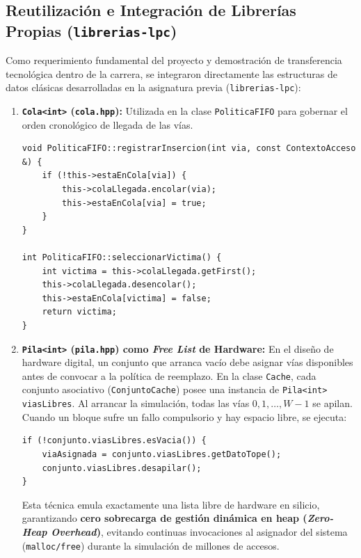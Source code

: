 \documentclass[11pt,letterpaper]{article}
\begin{document}
\subsection{Reutilización e Integración de Librerías Propias (\texttt{librerias-lpc})}
Como requerimiento fundamental del proyecto y demostración de transferencia tecnológica dentro de la carrera, se integraron directamente las estructuras de datos clásicas desarrolladas en la asignatura previa (\texttt{librerias-lpc}):

\begin{enumerate}
    \item \textbf{\texttt{Cola<int>} (\texttt{cola.hpp}):} Utilizada en la clase \texttt{PoliticaFIFO} para gobernar el orden cronológico de llegada de las vías. 
    \begin{lstlisting}[caption={Integración de \texttt{Cola<int>} en \texttt{PoliticaFIFO}.}, label={lst:cola_fifo}]
void PoliticaFIFO::registrarInsercion(int via, const ContextoAcceso &) {
    if (!this->estaEnCola[via]) {
        this->colaLlegada.encolar(via);
        this->estaEnCola[via] = true;
    }
}

int PoliticaFIFO::seleccionarVictima() {
    int victima = this->colaLlegada.getFirst();
    this->colaLlegada.desencolar();
    this->estaEnCola[victima] = false;
    return victima;
}
    \end{lstlisting}
    
    \item \textbf{\texttt{Pila<int>} (\texttt{pila.hpp}) como \textit{Free List} de Hardware:} En el diseño de hardware digital, un conjunto que arranca vacío debe asignar vías disponibles antes de convocar a la política de reemplazo. En la clase \texttt{Cache}, cada conjunto asociativo (\texttt{ConjuntoCache}) posee una instancia de \texttt{Pila<int> viasLibres}. Al arrancar la simulación, todas las vías $0, 1, \dots, W-1$ se apilan. Cuando un bloque sufre un fallo compulsorio y hay espacio libre, se ejecuta:
    \begin{lstlisting}[caption={Asignación de vía libre en $O(1)$ sin desalojo mediante \texttt{Pila<int>}.}, label={lst:pila_freelist}]
if (!conjunto.viasLibres.esVacia()) {
    viaAsignada = conjunto.viasLibres.getDatoTope();
    conjunto.viasLibres.desapilar();
}
    \end{lstlisting}
    Esta técnica emula exactamente una lista libre de hardware en silicio, garantizando \textbf{cero sobrecarga de gestión dinámica en heap (\textit{Zero-Heap Overhead})}, evitando continuas invocaciones al asignador del sistema (\texttt{malloc/free}) durante la simulación de millones de accesos.
\end{enumerate}
\end{document}
